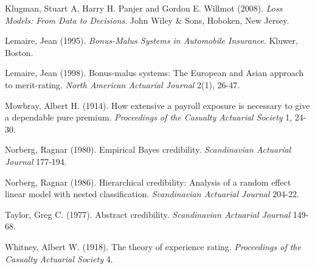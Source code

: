 \begin{multicols}{2}
Klugman, Stuart A, Harry H. Panjer and Gordon E. Willmot (2008).
\emph{Loss Models: From Data to Decisions}. John Wiley \& Sons,
Hoboken, New Jersey.

Lemaire, Jean (1995). \textit{Bonus-Malus Systems in Automobile
Insurance}. Kluwer, Boston.

Lemaire, Jean (1998). Bonus-malus systems: The European and Asian
approach to merit-rating. \emph{North American Actuarial Journal}
2(1), 26-47.

Mowbray, Albert H. (1914). How extensive a payroll exposure is
necessary to give a dependable pure premium. \textit{Proceedings of
the Casualty Actuarial Society} 1, 24-30.

Norberg, Ragnar (1980). Empirical Bayes credibility.
\textit{Scandinavian Actuarial Journal} 177-194.

Norberg, Ragnar (1986). Hierarchical credibility: Analysis of a
random effect linear model with nested classification.
\textit{Scandinavian Actuarial Journal} 204-22.

Taylor, Greg C. (1977). Abstract credibility. \textit{Scandinavian
Actuarial Journal} 149-68.

Whitney, Albert W. (1918). The theory of experience rating.
\textit{Proceedings of the Casualty Actuarial Society} 4.

\end{multicols}


